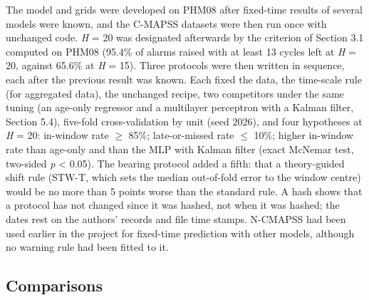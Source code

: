 \documentclass[a4paper,fleqn,doubleblind]{cas-dc}
\begin{document}
The model and grids were developed on PHM08 after fixed-time results of several models were known, and the C-MAPSS datasets were then run once with unchanged code. \textit{H} = 20 was designated afterwards by the criterion of Section 3.1 computed on PHM08 (95.4\% of alarms raised with at least 13 cycles left at \textit{H} = 20, against 65.6\% at \textit{H} = 15). Three protocols were then written in sequence, each after the previous result was known. Each fixed the data, the time-scale rule (for aggregated data), the unchanged recipe, two competitors under the same tuning (an age-only regressor and a multilayer perceptron with a Kalman filter, Section 5.4), five-fold cross-validation by unit (seed 2026), and four hypotheses at \textit{H} = 20: in-window rate $\ge$ 85\%; late-or-missed rate $\le$ 10\%; higher in-window rate than age-only and than the MLP with Kalman filter (exact McNemar test, two-sided \textit{p} < 0.05). The bearing protocol added a fifth: that a theory-guided shift rule (STW-T, which sets the median out-of-fold error to the window centre) would be no more than 5 points worse than the standard rule. A hash shows that a protocol has not changed since it was hashed, not when it was hashed; the dates rest on the authors' records and file time stamps. N-CMAPSS had been used earlier in the project for fixed-time prediction with other models, although no warning rule had been fitted to it.

\subsection{Comparisons}
\end{document}
